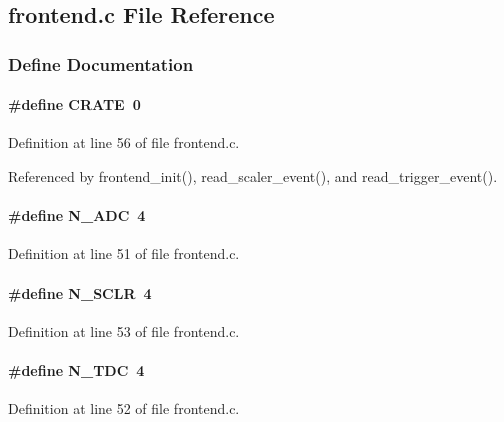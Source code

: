 \subsection{frontend.c File Reference}
\label{frontend_8c}


\subsubsection{Define Documentation}
\paragraph[{CRATE}]{\setlength{\rightskip}{0pt plus 5cm}\#define CRATE~0}\hfill\label{frontend_8c_ad927298c4aa5421ba6e9c19a15535a16}


Definition at line 56 of file frontend.c.

Referenced by frontend\_\-init(), read\_\-scaler\_\-event(), and read\_\-trigger\_\-event().
\paragraph[{N\_\-ADC}]{\setlength{\rightskip}{0pt plus 5cm}\#define N\_\-ADC~4}\hfill\label{frontend_8c_aeac9187aeffc031aa4adaf856d17093b}


Definition at line 51 of file frontend.c.
\paragraph[{N\_\-SCLR}]{\setlength{\rightskip}{0pt plus 5cm}\#define N\_\-SCLR~4}\hfill\label{frontend_8c_ad2e95a3b1cf99277a9faad8a41d0ab8b}


Definition at line 53 of file frontend.c.
\paragraph[{N\_\-TDC}]{\setlength{\rightskip}{0pt plus 5cm}\#define N\_\-TDC~4}\hfill\label{frontend_8c_a7e9c82b300255f54b1528c66fdcdfafd}


Definition at line 52 of file frontend.c.
